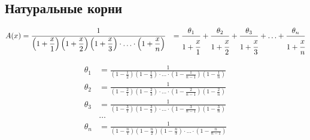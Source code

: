 
\subsection{Натуральные корни}

\begin{equation*} \begin{aligned}
A(x) &=
\frac{1}
{
  \left(1 + \displaystyle \frac{x}{1} \right)
  \left(1 + \displaystyle \frac{x}{2} \right)
  \left(1 + \displaystyle \frac{x}{3} \right)
  \cdot \ldots \cdot
  \left(1 + \displaystyle \frac{x}{n} \right)
} &
= \frac{\theta_1}{1 + \cfrac{x}{1}}
+ \frac{\theta_2}{1 + \cfrac{x}{2}}
+ \frac{\theta_3}{1 + \cfrac{x}{3}}
+ \ldots
+ \frac{\theta_n}{1 + \cfrac{x}{n}} \\
\end{aligned} \end{equation*}

\begin{equation*} \begin{aligned}
\theta_1 &= \frac{1}
{
  \left(1 - \displaystyle \frac{1}{2} \right)
  \left(1 - \displaystyle \frac{1}{3} \right)
  \cdot \ldots \cdot
  \left(1 - \displaystyle \frac{1}{n - 1} \right)
  \left(1 - \displaystyle \frac{1}{n} \right)
} \\
\theta_2 &= \frac{1}
{
  \left(1 - \displaystyle \frac{2}{1} \right)
  \left(1 - \displaystyle \frac{2}{3} \right)
  \cdot \ldots \cdot
  \left(1 - \displaystyle \frac{2}{n - 1} \right)
  \left(1 - \displaystyle \frac{2}{n} \right)
} \\
\theta_3 &= \frac{1}
{
  \left(1 - \displaystyle \frac{3}{1} \right)
  \left(1 - \displaystyle \frac{3}{2} \right)
  \cdot \ldots \cdot
  \left(1 - \displaystyle \frac{3}{n - 1} \right)
  \left(1 - \displaystyle \frac{3}{n} \right)
} \\
&\ldots \\
\theta_n &= \frac{1}
{
  \left(1 - \displaystyle \frac{n}{1} \right)
  \left(1 - \displaystyle \frac{n}{2} \right)
  \left(1 - \displaystyle \frac{n}{3} \right)
  \cdot \ldots \cdot
  \left(1 - \displaystyle \frac{n}{n - 1} \right)
} \\
\end{aligned} \end{equation*}

